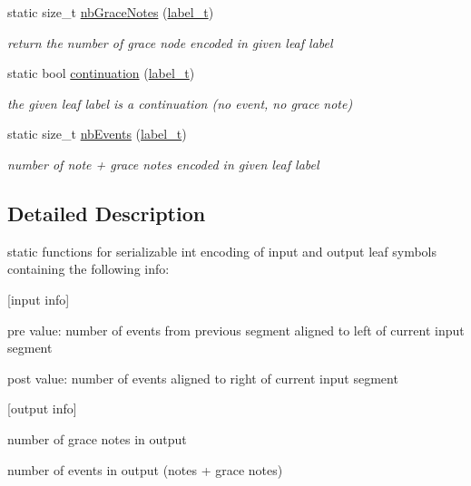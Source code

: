 \begin{DoxyCompactItemize}
static size\+\_\+t \mbox{\hyperlink{group__output_ga0f5679843d6bcd3e97ecd535c4d3c6f8}{nb\+Grace\+Notes}} (\mbox{\hyperlink{group__output_ga22fde970e635fcf63962743b2d5c441d}{label\+\_\+t}})
\begin{DoxyCompactList}\small\item\em return the number of grace node encoded in given leaf label \end{DoxyCompactList}\item 
static bool \mbox{\hyperlink{group__output_gaaf4c88a23710366cbe35081a0967b536}{continuation}} (\mbox{\hyperlink{group__output_ga22fde970e635fcf63962743b2d5c441d}{label\+\_\+t}})
\begin{DoxyCompactList}\small\item\em the given leaf label is a continuation (no event, no grace note) \end{DoxyCompactList}\item 
static size\+\_\+t \mbox{\hyperlink{group__output_ga2d7e95e5b2cc887aa9c4db52fab1b0d3}{nb\+Events}} (\mbox{\hyperlink{group__output_ga22fde970e635fcf63962743b2d5c441d}{label\+\_\+t}})
\begin{DoxyCompactList}\small\item\em number of note + grace notes encoded in given leaf label \end{DoxyCompactList}\end{DoxyCompactItemize}


\subsection{Detailed Description}
static functions for serializable int encoding of input and output leaf symbols containing the following info\+: 


\begin{DoxyItemize}
\item \mbox{[}input info\mbox{]}
\begin{DoxyItemize}
\item pre value\+: number of events from previous segment aligned to left of current input segment
\item post value\+: number of events aligned to right of current input segment
\end{DoxyItemize}
\item \mbox{[}output info\mbox{]}
\begin{DoxyItemize}
\item number of grace notes in output
\item number of events in output (notes + grace notes)
\end{DoxyItemize}
\end{DoxyItemize}

